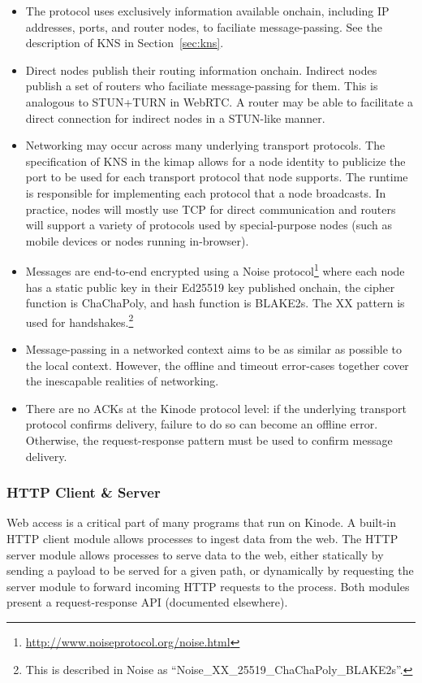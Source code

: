 \documentclass[runningheads]{llncs}
\begin{document}
\begin{itemize}
    \item The protocol uses exclusively information available onchain, including IP addresses, ports, and router nodes, to faciliate message-passing.
    See the description of KNS in Section~\ref{sec:kns}.
    \item Direct nodes publish their routing information onchain.
    Indirect nodes publish a set of routers who faciliate message-passing for them.
    This is analogous to STUN+TURN in WebRTC.
    A router may be able to facilitate a direct connection for indirect nodes in a STUN-like manner.
    \item Networking may occur across many underlying transport protocols.
    The specification of KNS in the kimap allows for a node identity to publicize the port to be used for each transport protocol that node supports.
    The runtime is responsible for implementing each protocol that a node broadcasts.
    In practice, nodes will mostly use TCP for direct communication and routers will support a variety of protocols used by special-purpose nodes (such as mobile devices or nodes running in-browser).
    \item Messages are end-to-end encrypted using a Noise protocol\footnote{\url{http://www.noiseprotocol.org/noise.html}}
    where each node has a static public key in their Ed25519 key published onchain, the cipher function is ChaChaPoly, and hash function is BLAKE2s.
    The XX pattern is used for handshakes.\footnote{This is described in Noise as ``Noise\_XX\_25519\_ChaChaPoly\_BLAKE2s''.}
    \item Message-passing in a networked context aims to be as similar as possible to the local context.
    However, the offline and timeout error-cases together cover the inescapable realities of networking.
    \item There are no ACKs at the Kinode protocol level: if the underlying transport protocol confirms delivery, failure to do so can become an offline error.
    Otherwise, the request-response pattern must be used to confirm message delivery.
\end{itemize}

\subsubsection{HTTP Client \& Server}
\label{sec:oshttp}

Web access is a critical part of many programs that run on Kinode.
A built-in HTTP client module allows processes to ingest data from the web.
The HTTP server module allows processes to serve data to the web, either statically by sending a payload to be served for a given path, or dynamically by requesting the server module to forward incoming HTTP requests to the process.
Both modules present a request-response API (documented elsewhere).
\end{document}
